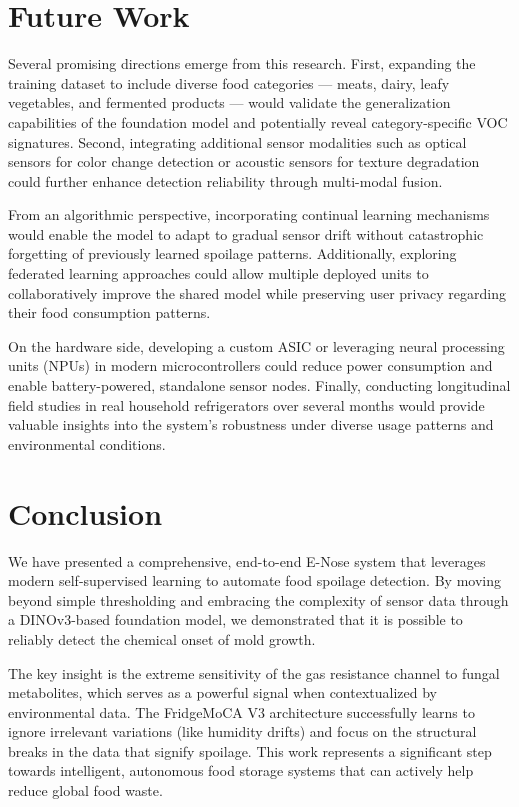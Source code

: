\documentclass[conference]{IEEEtran}
\begin{document}
    \section{Future Work}

    Several promising directions emerge from this research. First, expanding the training dataset to include diverse food categories — meats, dairy, leafy vegetables, and fermented products — would validate the generalization capabilities of the foundation model and potentially reveal category-specific VOC signatures. Second, integrating additional sensor modalities such as optical sensors for color change detection or acoustic sensors for texture degradation could further enhance detection reliability through multi-modal fusion.

    From an algorithmic perspective, incorporating continual learning mechanisms would enable the model to adapt to gradual sensor drift without catastrophic forgetting of previously learned spoilage patterns. Additionally, exploring federated learning approaches could allow multiple deployed units to collaboratively improve the shared model while preserving user privacy regarding their food consumption patterns.

    On the hardware side, developing a custom ASIC or leveraging neural processing units (NPUs) in modern microcontrollers could reduce power consumption and enable battery-powered, standalone sensor nodes. Finally, conducting longitudinal field studies in real household refrigerators over several months would provide valuable insights into the system's robustness under diverse usage patterns and environmental conditions.

    \section{Conclusion}

    We have presented a comprehensive, end-to-end E-Nose system that leverages modern self-supervised learning to automate food spoilage detection. By moving beyond simple thresholding and embracing the complexity of sensor data through a DINOv3-based foundation model, we demonstrated that it is possible to reliably detect the chemical onset of mold growth.

    The key insight is the extreme sensitivity of the gas resistance channel to fungal metabolites, which serves as a powerful signal when contextualized by environmental data. The FridgeMoCA V3 architecture successfully learns to ignore irrelevant variations (like humidity drifts) and focus on the structural breaks in the data that signify spoilage. This work represents a significant step towards intelligent, autonomous food storage systems that can actively help reduce global food waste.
\end{document}
